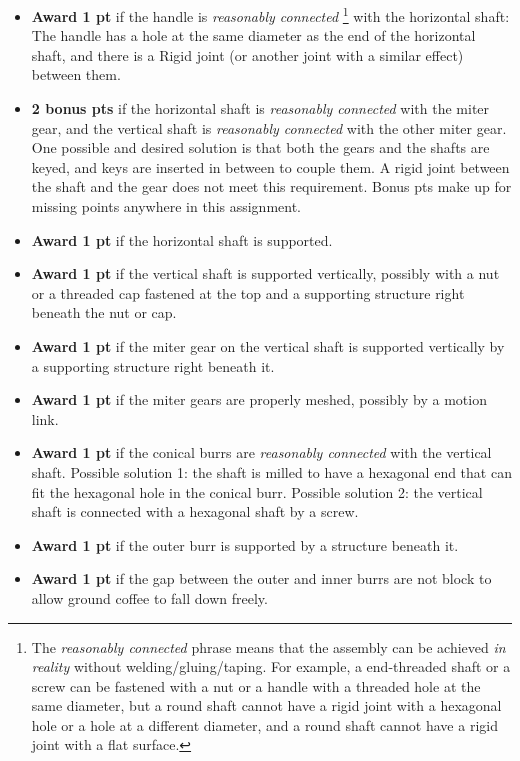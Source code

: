 \documentclass[11pt]{article}
\begin{document}
\begin{itemize}

\item \textbf{Award 1 pt} if the handle is \textit{reasonably connected}
\footnote[1]{The \textit{reasonably connected} phrase means that the assembly can be achieved \textit{in reality} without welding/gluing/taping. For example, a end-threaded shaft or a screw can be fastened with a nut or a handle with a threaded hole at the same diameter, but a round shaft cannot have a rigid joint with a hexagonal hole or a hole at a different diameter, and a round shaft cannot have a rigid joint with a flat surface. } 
with the horizontal shaft: The handle has a hole at the same diameter as the end of the horizontal shaft, and there is a Rigid joint (or another joint with a similar effect) between them. 

\item \textbf{2 bonus pts} if the horizontal shaft is \textit{reasonably connected} with the miter gear, and the vertical shaft is \textit{reasonably connected} with the other miter gear. One possible and desired solution is that both the gears and the shafts are keyed, and keys are inserted in between to couple them. A rigid joint between the shaft and the gear does not meet this requirement. Bonus pts make up for missing points anywhere in this assignment. 

\item \textbf{Award 1 pt} if the horizontal shaft is supported.

\item \textbf{Award 1 pt} if the vertical shaft is supported vertically, possibly with a nut or a threaded cap fastened at the top and a supporting structure right beneath the nut or cap. 

\item \textbf{Award 1 pt} if the miter gear on the vertical shaft is supported vertically by a supporting structure right beneath it. 

\item \textbf{Award 1 pt} if the miter gears are properly meshed, possibly by a motion link. 

\item \textbf{Award 1 pt} if the conical burrs are \textit{reasonably connected} with the vertical shaft. Possible solution 1: the shaft is milled to have a hexagonal end that can fit the hexagonal hole in the conical burr. Possible solution 2: the vertical shaft is connected with a hexagonal shaft by a screw. 

\item \textbf{Award 1 pt} if the outer burr is supported by a structure beneath it.

\item \textbf{Award 1 pt} if the gap between the outer and inner burrs are not block to allow ground coffee to fall down freely.


\end{itemize}
\end{document}
